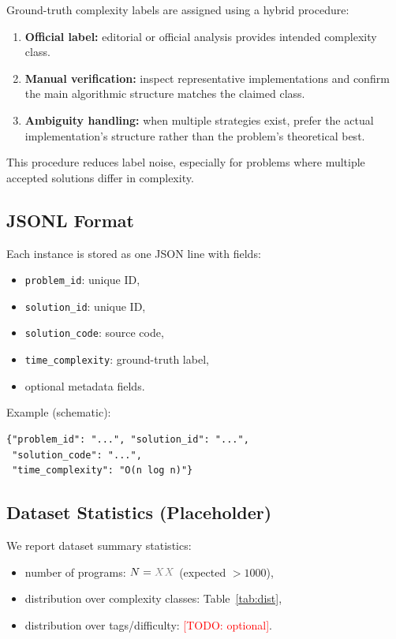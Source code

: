 \documentclass[conference]{IEEEtran}
\newcommand{\TODO}[1]{\textcolor{red}{[TODO: #1]}}
\newcommand{\placeholder}{\textcolor{gray}{XX}}
\begin{document}
Ground-truth complexity labels are assigned using a hybrid procedure:
\begin{enumerate}[leftmargin=1.2em]
\item \textbf{Official label:} editorial or official analysis provides intended
complexity class.
\item \textbf{Manual verification:} inspect representative implementations and
confirm the main algorithmic structure matches the claimed class.
\item \textbf{Ambiguity handling:} when multiple strategies exist, prefer the
actual implementation's structure rather than the problem's theoretical best.
\end{enumerate}

This procedure reduces label noise, especially for problems where multiple
accepted solutions differ in complexity.

\subsection{JSONL Format}

Each instance is stored as one JSON line with fields:
\begin{itemize}[leftmargin=1.2em]
\item \texttt{problem\_id}: unique ID,
\item \texttt{solution\_id}: unique ID,
\item \texttt{solution\_code}: source code,
\item \texttt{time\_complexity}: ground-truth label,
\item optional metadata fields.
\end{itemize}

Example (schematic):
\begin{verbatim}
{"problem_id": "...", "solution_id": "...",
 "solution_code": "...",
 "time_complexity": "O(n log n)"}
\end{verbatim}

\subsection{Dataset Statistics (Placeholder)}

We report dataset summary statistics:
\begin{itemize}[leftmargin=1.2em]
\item number of programs: $N = \placeholder$ (expected $>1000$),
\item distribution over complexity classes: Table~\ref{tab:dist},
\item distribution over tags/difficulty: \TODO{optional}.
\end{itemize}
\end{document}

